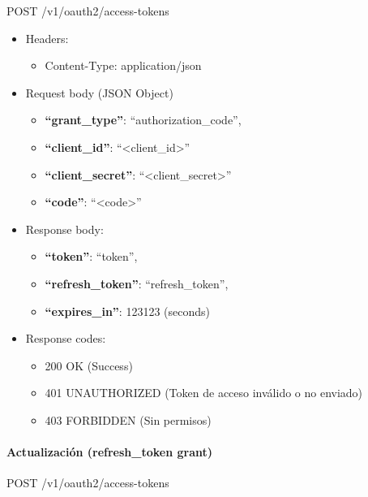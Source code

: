 \documentclass[12pt,a4paperpaper,]{report}
\providecommand{\tightlist}{%
  \setlength{\itemsep}{0pt}\setlength{\parskip}{0pt}}
\let\oldparagraph\paragraph
\renewcommand{\paragraph}[1]{\oldparagraph{#1}\mbox{}}
\begin{document}
POST /v1/oauth2/access-tokens

\begin{itemize}
\tightlist
\item
  Headers:

  \begin{itemize}
  \tightlist
  \item
    Content-Type: application/json
  \end{itemize}
\item
  Request body (JSON Object)

  \begin{itemize}
  \tightlist
  \item
    \textbf{``grant\_type''}: ``authorization\_code'',
  \item
    \textbf{``client\_id''}: ``\textless{}client\_id\textgreater{}''
  \item
    \textbf{``client\_secret''}:
    ``\textless{}client\_secret\textgreater{}''
  \item
    \textbf{``code''}: ``\textless{}code\textgreater{}''
  \end{itemize}
\item
  Response body:

  \begin{itemize}
  \tightlist
  \item
    \textbf{``token''}: ``token'',
  \item
    \textbf{``refresh\_token''}: ``refresh\_token'',
  \item
    \textbf{``expires\_in''}: 123123 (seconds)
  \end{itemize}
\item
  Response codes:

  \begin{itemize}
  \tightlist
  \item
    200 OK (Success)
  \item
    401 UNAUTHORIZED (Token de acceso inválido o no enviado)
  \item
    403 FORBIDDEN (Sin permisos)
  \end{itemize}
\end{itemize}

\paragraph{Actualización (refresh\_token
grant)}\label{actualizaciuxf3n-refresh_token-grant}

POST /v1/oauth2/access-tokens
\end{document}
